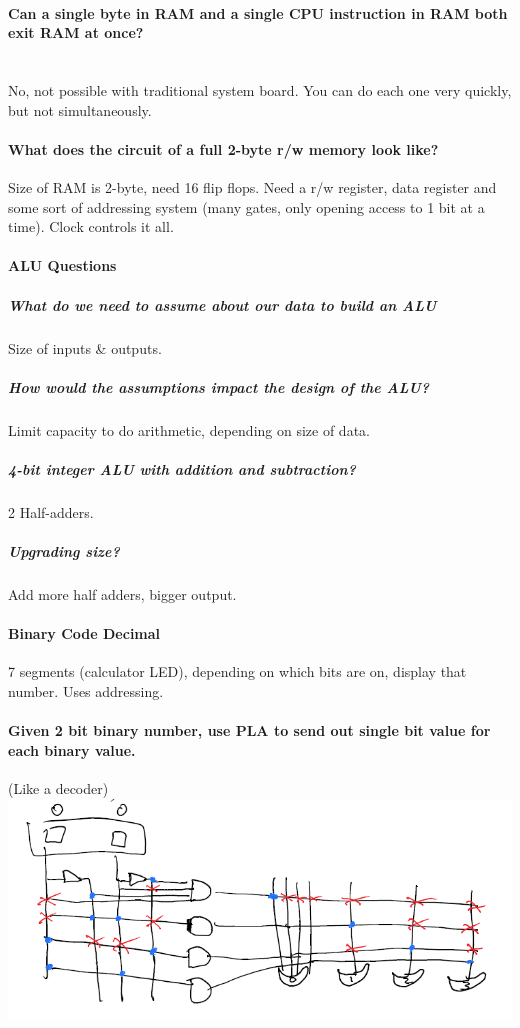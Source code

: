 \documentclass[12 pt]{article}
\begin{document}
		\paragraph{Can a single byte in RAM and a single CPU instruction in RAM both exit RAM at once?}
		~\\ No, not possible with traditional system board. You can do each one very quickly, but not simultaneously.
		\paragraph{What does the circuit of a full 2-byte r/w memory look like?}
		Size of RAM is 2-byte, need 16 flip flops. Need a r/w register, data register and some sort of addressing system (many gates, only opening access to 1 bit at a time). Clock controls it all.
		\paragraph{ALU Questions}
		\subparagraph{What do we need to assume about our data to build an ALU}
		Size of inputs \& outputs.
		\subparagraph{How would the assumptions impact the design of the ALU?} Limit capacity to do arithmetic, depending on size of data.
		\subparagraph{4-bit integer ALU with addition and subtraction?} 2 Half-adders.
		\subparagraph{Upgrading size?} Add more half adders, bigger output.
		\paragraph{Binary Code Decimal}
		7 segments (calculator LED), depending on which bits are on, display that number. Uses addressing.
		\paragraph{Given 2 bit binary number, use PLA to send out single bit value for each binary value.} (Like a decoder) \\
		\includegraphics[scale=0.8]{pladd}
\end{document}
